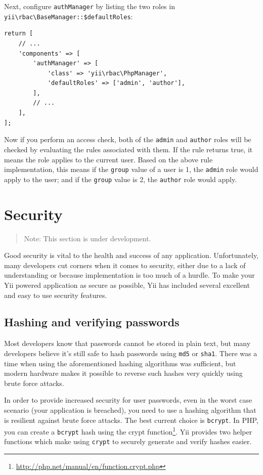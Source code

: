 Next, configure \lstinline|authManager| by listing the two roles in \texttt{yii{\allowbreak{}\textbackslash}rbac{\allowbreak{}\textbackslash}BaseManager\allowbreak{}::\allowbreak{}\$defaultRoles}:

\lstset{language=php}\begin{lstlisting}
return [
    // ...
    'components' => [
        'authManager' => [
            'class' => 'yii\rbac\PhpManager',
            'defaultRoles' => ['admin', 'author'],
        ],
        // ...
    ],
];
\end{lstlisting}
Now if you perform an access check, both of the \lstinline|admin| and \lstinline|author| roles will be checked by evaluating
the rules associated with them. If the rule returns true, it means the role applies to the current user.
Based on the above rule implementation, this means if the \lstinline|group| value of a user is 1, the \lstinline|admin| role
would apply to the user; and if the \lstinline|group| value is 2, the \lstinline|author| role would apply.



\label{security-passwords.md}\section{Security}
\begin{quote}Note: This section is under development.

\end{quote}
Good security is vital to the health and success of any application. Unfortunately, many developers cut corners when it comes to security, either due to a lack of understanding or because implementation is too much of a hurdle. To make your Yii powered application as secure as possible, Yii has included several excellent and easy to use security features.

\subsection{Hashing and verifying passwords}
Most developers know that passwords cannot be stored in plain text, but many developers believe it's still safe to hash passwords using \lstinline|md5| or \lstinline|sha1|. There was a time when using the aforementioned hashing algorithms was sufficient, but modern hardware makes it possible to reverse such hashes very quickly using brute force attacks.

In order to provide increased security for user passwords, even in the worst case scenario (your application is breached), you need to use a hashing algorithm that is resilient against brute force attacks. The best current choice is \lstinline|bcrypt|. In PHP, you can create a \lstinline|bcrypt| hash  using the crypt function\footnote{\url{http://php.net/manual/en/function.crypt.php}}. Yii provides two helper functions which make using \lstinline|crypt| to securely generate and verify hashes easier.

